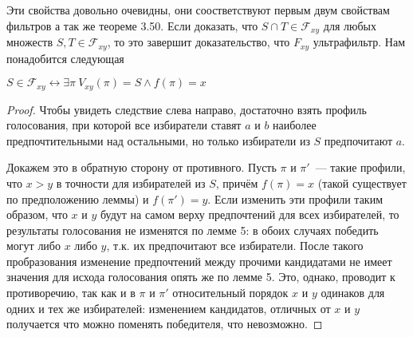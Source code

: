 Эти свойства довольно очевидны, они соостветствуют первым двум свойствам фильтров а так же теореме 3.50. Если доказать, что $S\cap T\in\mathcal{F}_{xy}$ для любых множеств $S, T\in\mathcal{F}_{xy}$, то это завершит доказательство, что $F_{xy}$ ультрафильтр. Нам понадобится следующая

\begin{lemma}
$S\in\mathcal{F}_{xy} \leftrightarrow \exists \pi\ V_{xy}(\pi) = S \land f(\pi) = x$
\end{lemma}
\begin{proof}
Чтобы увидеть следствие слева направо, достаточно взять профиль голосования, при которой все избиратели ставят $a$ и $b$ наиболее предпочтительными над остальными, но только избиратели из $S$ предпочитают $a$.

Докажем это в обратную сторону от противного. Пусть $\pi$ и $\pi'$~--- такие профили, что $x>y$ в точности для избирателей из $S$, причём $f(\pi)=x$ (такой существует по предположению леммы) и $f(\pi') = y$. Если изменить эти профили таким образом, что $x$ и $y$ будут на самом верху предпочтений для всех избирателей, то результаты голосования не изменятся по лемме 5: в обоих случаях победить могут либо $x$ либо $y$, т.к. их предпочитают все избиратели. После такого пробразования изменение предпочтений между прочими кандидатами не имеет значения для исхода голосования опять же по лемме 5. Это, однако, проводит к противоречию, так как и в $\pi$ и $\pi'$ относительный порядок $x$ и $y$ одинаков для одних и тех же избирателей: изменением кандидатов, отличных от $x$ и $y$ получается что можно поменять победителя, что невозможно.
\end{proof}

